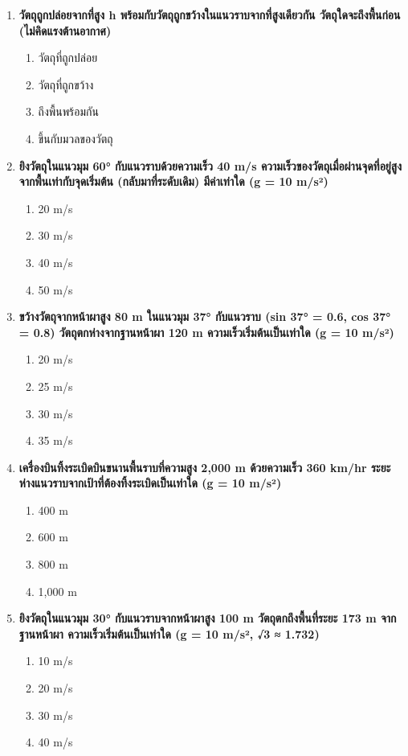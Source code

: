 \documentclass[12pt]{article}
\begin{document}
\begin{enumerate}
\begin{enumerate}[label=\alph*)]
\item 45 m
\item 80 m
\item 100 m
\item 125 m
\end{enumerate}
\item \textbf{วัตถุถูกปล่อยจากที่สูง h พร้อมกับวัตถุถูกขว้างในแนวราบจากที่สูงเดียวกัน วัตถุใดจะถึงพื้นก่อน (ไม่คิดแรงต้านอากาศ)}
\begin{enumerate}[label=\alph*)]
\item วัตถุที่ถูกปล่อย
\item วัตถุที่ถูกขว้าง
\item ถึงพื้นพร้อมกัน
\item ขึ้นกับมวลของวัตถุ
\end{enumerate}
\item \textbf{ยิงวัตถุในแนวมุม 60° กับแนวราบด้วยความเร็ว 40 m/s ความเร็วของวัตถุเมื่อผ่านจุดที่อยู่สูงจากพื้นเท่ากับจุดเริ่มต้น (กลับมาที่ระดับเดิม) มีค่าเท่าใด (g = 10 m/s²)}
\begin{enumerate}[label=\alph*)]
\item 20 m/s
\item 30 m/s
\item 40 m/s
\item 50 m/s
\end{enumerate}
\item \textbf{ขว้างวัตถุจากหน้าผาสูง 80 m ในแนวมุม 37° กับแนวราบ (sin 37° = 0.6, cos 37° = 0.8) วัตถุตกห่างจากฐานหน้าผา 120 m ความเร็วเริ่มต้นเป็นเท่าใด (g = 10 m/s²)}
\begin{enumerate}[label=\alph*)]
\item 20 m/s
\item 25 m/s
\item 30 m/s
\item 35 m/s
\end{enumerate}
\item \textbf{เครื่องบินทิ้งระเบิดบินขนานพื้นราบที่ความสูง 2,000 m ด้วยความเร็ว 360 km/hr ระยะห่างแนวราบจากเป้าที่ต้องทิ้งระเบิดเป็นเท่าใด (g = 10 m/s²)}
\begin{enumerate}[label=\alph*)]
\item 400 m
\item 600 m
\item 800 m
\item 1,000 m
\end{enumerate}
\item \textbf{ยิงวัตถุในแนวมุม 30° กับแนวราบจากหน้าผาสูง 100 m วัตถุตกถึงพื้นที่ระยะ 173 m จากฐานหน้าผา ความเร็วเริ่มต้นเป็นเท่าใด (g = 10 m/s², √3 ≈ 1.732)}
\begin{enumerate}[label=\alph*)]
\item 10 m/s
\item 20 m/s
\item 30 m/s
\item 40 m/s
\end{enumerate}
\end{enumerate}
\end{document}
